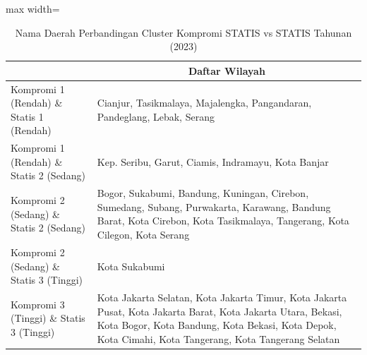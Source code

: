 \begin{table}[H]
\centering
\caption{Nama Daerah Perbandingan Cluster Kompromi STATIS vs STATIS Tahunan (2023)} \label{tab:app1comp_statis_name_2023}
\begin{adjustbox}{max width=\textwidth}
\begin{tabular}{|>{\centering\arraybackslash}p{4cm}|p{10cm}|}
\hline
\multicolumn{1}{|c|}{\textbf{Kategori}} & \multicolumn{1}{c|}{\textbf{Daftar Wilayah}} \\
\hline
Kompromi 1 (Rendah) \& Statis 1 (Rendah) & Cianjur, Tasikmalaya, Majalengka, Pangandaran, Pandeglang, Lebak, Serang \\
\hline
Kompromi 1 (Rendah) \& Statis 2 (Sedang) & Kep. Seribu, Garut, Ciamis, Indramayu, Kota Banjar \\
\hline
Kompromi 2 (Sedang) \& Statis 2 (Sedang) & Bogor, Sukabumi, Bandung, Kuningan, Cirebon, Sumedang, Subang, Purwakarta, Karawang, Bandung Barat, Kota Cirebon, Kota Tasikmalaya, Tangerang, Kota Cilegon, Kota Serang \\
\hline
Kompromi 2 (Sedang) \& Statis 3 (Tinggi) & Kota Sukabumi \\
\hline
Kompromi 3 (Tinggi) \& Statis 3 (Tinggi) & Kota Jakarta Selatan, Kota Jakarta Timur, Kota Jakarta Pusat, Kota Jakarta Barat, Kota Jakarta Utara, Bekasi, Kota Bogor, Kota Bandung, Kota Bekasi, Kota Depok, Kota Cimahi, Kota Tangerang, Kota Tangerang Selatan \\
\hline
\end{tabular}
\end{adjustbox}
\end{table}